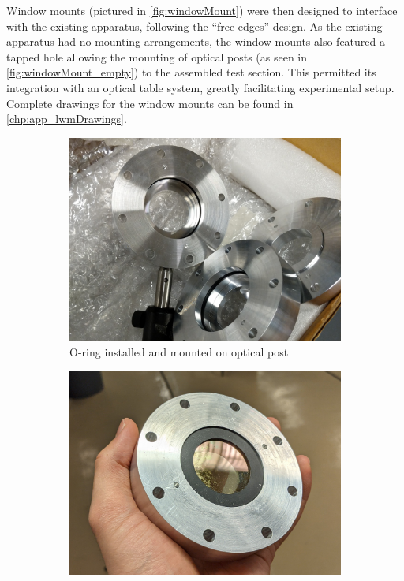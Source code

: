             Window mounts (pictured in \autoref{fig:windowMount}) were then designed to interface with the existing apparatus, following the ``free edges'' design. As the existing apparatus had no mounting arrangements, the window mounts also featured a tapped hole allowing the mounting of optical posts (as seen in \autoref{fig:windowMount_empty}) to the assembled test section. This permitted its integration with an optical table system, greatly facilitating experimental setup. Complete drawings for the window mounts can be found in \autoref{chp:app_lwmDrawings}.

            \begin{figure}[h]
                \centering
                \begin{subfigure}[t]{0.48\textwidth}
                    \centering
                    \includegraphics[width=\textwidth]{assets/3 design/windowMount_empty.jpg}
                    \caption{O-ring installed and mounted on optical post}
                    \label{fig:windowMount_empty}
                \end{subfigure}
                \hfill
                \begin{subfigure}[t]{0.48\textwidth}
                    \centering
                    \includegraphics[width=\textwidth]{assets/3 design/windowMount_installed.jpg}

\end{subfigure}
\end{figure}
